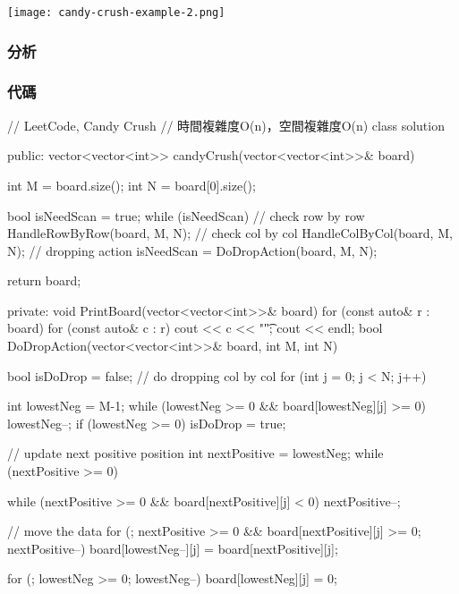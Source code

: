 \begin{center}
\texttt{[image: candy-crush-example-2.png]}\\
\label{fig:candy-crush-example}
\end{center}

\subsubsection{分析}

\subsubsection{代碼}
\begin{Code}
// LeetCode, Candy Crush
// 時間複雜度O(n)，空間複雜度O(n)
class solution{
public:
    vector<vector<int>> candyCrush(vector<vector<int>>& board) {
        int M = board.size();
        int N = board[0].size();

        bool isNeedScan = true;
        while (isNeedScan)
        {
            // check row by row
            HandleRowByRow(board, M, N);
            // check col by col
            HandleColByCol(board, M, N);
            // dropping action
            isNeedScan = DoDropAction(board, M, N);
        }

        return board;
    }
private:
    void PrintBoard(vector<vector<int>>& board)
    {
        for (const auto& r : board)
        {
            for (const auto& c : r)
                cout << c << "\t";
            cout << endl;
        }
    }
    bool DoDropAction(vector<vector<int>>& board, int M, int N)
    {
        bool isDoDrop = false;
        // do dropping col by col
        for (int j = 0; j < N; j++)
        {
            int lowestNeg = M-1;
            while (lowestNeg >= 0 && board[lowestNeg][j] >= 0) lowestNeg--;
            if (lowestNeg >= 0) isDoDrop = true;

            // update next positive position
            int nextPositive = lowestNeg;
            while (nextPositive >= 0)
            {
                while (nextPositive >= 0 && board[nextPositive][j] < 0) nextPositive--;
                
                // move the data
                for (; nextPositive >= 0 && board[nextPositive][j] >= 0; nextPositive--)
                    board[lowestNeg--][j] = board[nextPositive][j];
            }
            for (; lowestNeg >= 0; lowestNeg--)
                board[lowestNeg][j] = 0;
        }
        
}}
\end{Code}
